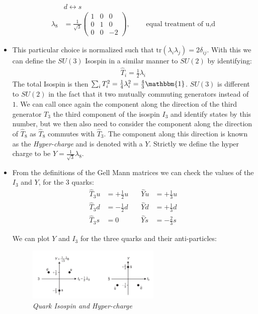 \documentclass[11pt]{article}
\numberwithin{equation}{section}
\begin{document}
\begin{itemize}
\begin{align*}
    & d \leftrightarrow s \\[10pt]
    \lambda_8 &= \frac{1}{\sqrt{3}} \begin{pmatrix} 1 & 0 & 0 \\ 0 & 1 & 0 \\ 0 & 0 & -2 \end{pmatrix},~~~&&\text{equal treatment of u,d}
\end{align*}
\item This particular choice is normalized such that $\text{tr}(\lambda_i\lambda_j) = 2\delta_{ij}$. With this we can define the $SU(3)$ Isospin in a similar manner to $SU(2)$ by identifying:
\begin{align*}
     \hat{T}_i = \frac{1}{2}\lambda_i
 \end{align*} 
 The total Isospin is then $\sum_i T^2_i = \frac{1}{4}\lambda_i^2 = \frac{4}{3}\mathbbm{1}$. $SU(3)$ is different to $SU(2)$ in the fact that it two mutually commuting generators instead of $1$. We can call once again the component along the direction of the third generator $T_3$ the third component of the isospin $I_3$ and identify states by this number, but we then also need to consider the component along the direction of $\hat{T}_8$ as $\hat{T}_8$ commutes with $\hat{T}_3$. The component along this direction is known as the \emph{Hyper-charge} and is denoted with a $Y$. Strictly we define the hyper charge to be $Y = \frac{1}{\sqrt{3}}\lambda_8$. 

 \item From the definitions of the Gell Mann matrices we can check the values of the $I_3$ and $Y$, for the 3 quarks:
\begin{align*}
    \hat{T}_3 u &= +\frac{1}{2} u & \quad \hat{Y} u &= +\frac{1}{3} u \\
    \hat{T}_3 d &= -\frac{1}{2} d & \quad \hat{Y} d &= +\frac{1}{3} d \\
    \hat{T}_3 s &= 0 & \quad \hat{Y} s &= -\frac{2}{3} s
\end{align*} 

 We can plot $Y$ and $I_3$ for the three quarks and their anti-particles:
 \begin{figure}[H]
\centering
\includegraphics[width=0.6\textwidth]{Hypercharge.png}
\caption{\label{trailer}\emph{Quark Isospin and Hyper-charge}}
\end{figure}  
\end{itemize}
\end{document}
